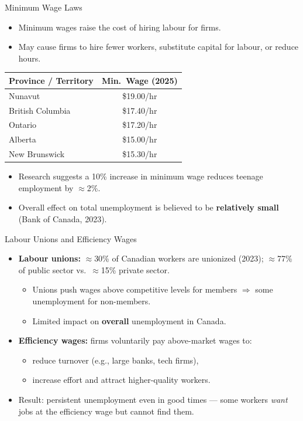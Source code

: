 \documentclass[aspectratio=169]{beamer}
\begin{document}
\begin{frame}{Minimum Wage Laws}
\transfade
\begin{itemize}
  \item Minimum wages raise the cost of hiring labour for firms.
  \item May cause firms to hire fewer workers, substitute capital for labour, or reduce hours.
\end{itemize}
\vspace{0.3em}
\begin{center}
\renewcommand{\arraystretch}{1.3}
\small
\begin{tabular}{lc}
\toprule
\textbf{Province / Territory} & \textbf{Min.\ Wage (2025)} \\
\midrule
Nunavut & \$19.00/hr \\
British Columbia & \$17.40/hr \\
Ontario & \$17.20/hr \\
Alberta & \$15.00/hr \\
New Brunswick & \$15.30/hr \\
\bottomrule
\end{tabular}
\end{center}
\begin{itemize}
  \item Research suggests a 10\% increase in minimum wage reduces teenage employment by $\approx$2\%.
  \item Overall effect on total unemployment is believed to be \textbf{relatively small} (Bank of Canada, 2023).
\end{itemize}
\end{frame}

\begin{frame}{Labour Unions and Efficiency Wages}
\transfade
\begin{itemize}
  \item \textbf{Labour unions:} $\approx$30\% of Canadian workers are unionized (2023); $\approx$77\% of public sector vs.\ $\approx$15\% private sector.
  \begin{itemize}
    \item Unions push wages above competitive levels for members $\Rightarrow$ some unemployment for non-members.
    \item Limited impact on \textbf{overall} unemployment in Canada.
  \end{itemize}
  \item \textbf{Efficiency wages:} firms voluntarily pay above-market wages to:
  \begin{itemize}
    \item reduce turnover (e.g., large banks, tech firms),
    \item increase effort and attract higher-quality workers.
  \end{itemize}
  \item Result: persistent unemployment even in good times --- some workers \emph{want} jobs at the efficiency wage but cannot find them.
\end{itemize}
\end{frame}
\end{document}
